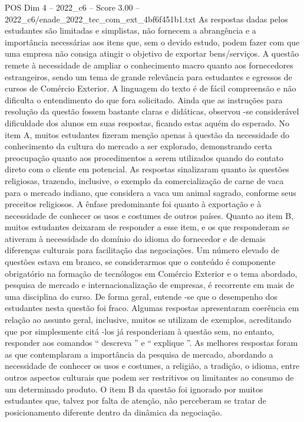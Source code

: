 \begin{textsample}{POS Dim 4 – 2022\_c6 – Score 3.00 – 2022\_c6/enade\_2022\_tec\_com\_ext\_4bf6f451b1.txt}
As respostas dadas pelos estudantes são limitadas e simplistas, não fornecem a abrangência e a importância necessárias aos itens que, sem o devido estudo, podem fazer com que uma empresa não consiga atingir o objetivo de exportar bens/serviços.
A questão remete à necessidade de ampliar o conhecimento macro quanto aos fornecedores estrangeiros, sendo um tema de grande relevância para estudantes e egressos de cursos de Comércio Exterior.
A linguagem do texto é de fácil compreensão e não dificulta o entendimento do que fora solicitado.
Ainda que as instruções para resolução da questão fossem bastante claras e didáticas, observou -se considerável dificuldade dos alunos em suas respostas, ficando estas aquém do esperado.
No item A, muitos estudantes fizeram menção apenas à questão da necessidade do conhecimento da cultura do mercado a ser explorado, demonstrando certa preocupação quanto aos procedimentos a serem utilizados quando do contato direto com o cliente em potencial.
As respostas sinalizaram quanto às questões religiosas, trazendo, inclusive, o exemplo da comercialização de carne de vaca para o mercado indiano, que considera a vaca um animal sagrado, conforme seus preceitos religiosos.
A ênfase predominante foi quanto à exportação e à necessidade de conhecer os usos e costumes de outros países.
Quanto ao item B, muitos estudantes deixaram de responder a esse item, e os que responderam se ativeram à necessidade do domínio do idioma do fornecedor e de demais diferenças culturais para facilitação das negociações.
Um número elevado de questões estava em branco, se considerarmos que o conteúdo é componente obrigatório na formação de tecnólogos em Comércio Exterior e o tema abordado, pesquisa de mercado e internacionalização de empresas, é recorrente em mais de uma disciplina do curso.
De forma geral, entende -se que o desempenho dos estudantes nesta questão foi fraco.
Algumas respostas apresentaram coerência em relação ao assunto geral, inclusive, muitos se utilizam de exemplos, acreditando que por simplesmente citá -los já responderiam à questão sem, no entanto, responder aos comandos “ descreva ” e “ explique ”.
As melhores respostas foram as que contemplaram a importância da pesquisa de mercado, abordando a necessidade de conhecer os usos e costumes, a religião, a tradição, o idioma, entre outros aspectos culturais que podem ser restritivos ou limitantes ao consumo de um determinado produto.
O item B da questão foi ignorado por muitos estudantes que, talvez por falta de atenção, não perceberam se tratar de posicionamento diferente dentro da dinâmica da negociação.

\end{textsample}
